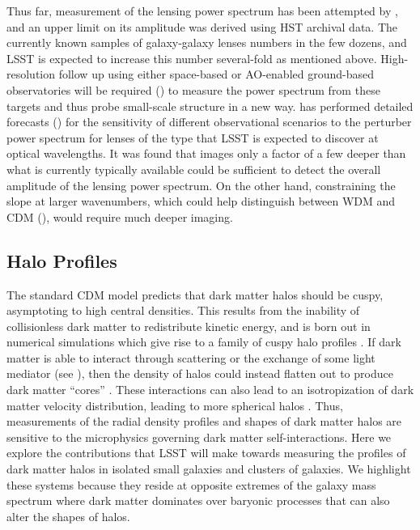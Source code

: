 \documentclass[modern,linenumbers]{aastex62}
\begin{document}
Thus far, measurement of the lensing power spectrum has been attempted by \cite{Bayer:2018vhy}, and an upper limit on its amplitude was derived using HST archival data. The currently known samples of galaxy-galaxy lenses numbers in the few dozens, and LSST is expected to increase this number several-fold as mentioned above. High-resolution follow up using either space-based or AO-enabled ground-based observatories will be required () to measure the power spectrum from these targets and thus probe small-scale structure in a new way. \citet{Cyr-Racine:2018htu} has performed detailed forecasts () for the sensitivity of different observational scenarios to the perturber power spectrum for lenses of the type that LSST is expected to discover at optical wavelengths. It was found that images only a factor of a few deeper than what is currently typically available \citep[\eg, from the SLACS sample][]{Bolton2008} could be sufficient to detect the overall amplitude of the lensing power spectrum. On the other hand, constraining the slope at larger wavenumbers, which could help distinguish between WDM and CDM (), would require much deeper imaging.

\subsection{Halo Profiles} 

The standard CDM model predicts that dark matter halos should be cuspy, asymptoting to high central densities.
This results from the inability of collisionless dark matter to redistribute kinetic energy, and is born out in numerical simulations which give rise to a family of cuspy halo profiles \citep[\eg, the NFW profile,][]{Navarro:1996gj}.
If dark matter is able to interact through scattering or the exchange of some light mediator (see ), then the density of halos could instead flatten out to produce dark matter ``cores'' \citep{Spergel:1999mh}.
These interactions can also lead to an isotropization of dark matter velocity distribution, leading to more spherical halos \citep{Peter:2013}.
Thus, measurements of the radial density profiles and shapes of dark matter halos are sensitive to the microphysics governing dark matter self-interactions.
Here we explore the contributions that LSST will make towards measuring the profiles of dark matter halos in isolated small galaxies and clusters of galaxies.
We highlight these systems because they reside at opposite extremes of the galaxy mass spectrum where dark matter dominates over baryonic processes that can also alter the shapes of halos.
\end{document}
